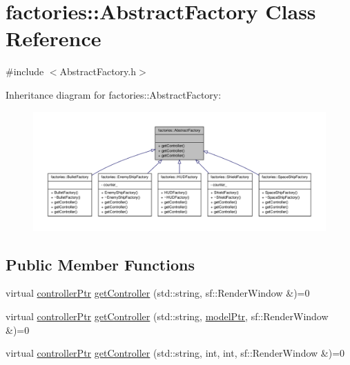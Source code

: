 \hypertarget{classfactories_1_1AbstractFactory}{\section{factories\-:\-:\-Abstract\-Factory \-Class \-Reference}
\label{d4/d92/classfactories_1_1AbstractFactory}
}


{\ttfamily \#include $<$\-Abstract\-Factory.\-h$>$}



\-Inheritance diagram for factories\-:\-:\-Abstract\-Factory\-:
\nopagebreak
\begin{figure}[H]
\begin{center}
\leavevmode
\includegraphics[width=350pt]{da/db6/classfactories_1_1AbstractFactory__inherit__graph}
\end{center}
\end{figure}
\subsection*{\-Public \-Member \-Functions}
\begin{DoxyCompactItemize}
\item 
virtual \hyperlink{Game_8h_a21b04f6cf2d5990b82725fac5ea2ce9a}{controller\-Ptr} \hyperlink{classfactories_1_1AbstractFactory_aa8fb1f6b6c66a0ec838f7ed9ecc653cc}{get\-Controller} (std\-::string, sf\-::\-Render\-Window \&)=0
\item 
virtual \hyperlink{Game_8h_a21b04f6cf2d5990b82725fac5ea2ce9a}{controller\-Ptr} \hyperlink{classfactories_1_1AbstractFactory_aedb9107644eb0ce511dec24abf6bf510}{get\-Controller} (std\-::string, \hyperlink{ModelView_8h_a78966ddb517fca8d2b29a2bc5c31e74e}{model\-Ptr}, sf\-::\-Render\-Window \&)=0
\item 
virtual \hyperlink{Game_8h_a21b04f6cf2d5990b82725fac5ea2ce9a}{controller\-Ptr} \hyperlink{classfactories_1_1AbstractFactory_a6ddc950e644a27fedbe463cbdf5df178}{get\-Controller} (std\-::string, int, int, sf\-::\-Render\-Window \&)=0
\end{DoxyCompactItemize}


